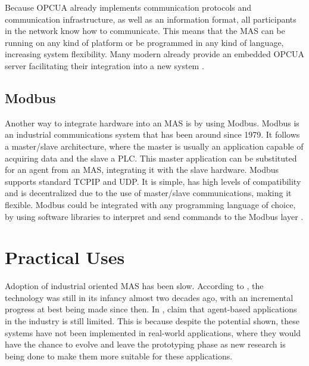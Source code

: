 Because \acrshort{OPCUA} already implements communication protocols and communication infrastructure, as well as an information format, all participants in the network know how to communicate. This means that the \acrshort{MAS} can be running on any kind of platform or be programmed in any kind of language, increasing system flexibility. Many modern  already provide an embedded \acrshort{OPCUA} server facilitating their integration into a new system \cite{Seitz2021}.

\subsection{Modbus}

Another way to integrate hardware into an \acrshort{MAS} is by using Modbus. Modbus is an industrial communications system that has been around since 1979. It follows a master/slave architecture, where the master is usually an application capable of acquiring data and the slave a \acrshort{PLC}. This master application can be substituted for an agent from an \acrshort{MAS}, integrating it with the slave hardware. Modbus supports standard \acrshort{TCPIP} and \acrshort{UDP}. It is simple, has high levels of compatibility and is decentralized due to the use of master/slave communications, making it flexible. Modbus could be integrated with any programming language of choice, by using software libraries to interpret and send commands to the Modbus layer \cite{10084891}.
\section{Practical Uses}
\label{sec:practical_uses}

Adoption of industrial oriented \acrshort{MAS} has been slow. According to \citeauthor{karnouskos02} \cite{karnouskos02}, the technology was still in its infancy almost two decades ago, with an incremental progress at best being made since then. In \cite{Karnouskos2019}, \citeauthor{Karnouskos2019} claim that agent-based applications in the industry is still limited. This is because despite the potential shown, these systems have not been implemented in real-world applications, where they would have the chance to evolve and leave the prototyping phase as new research is being done to make them more suitable for these applications.\\


